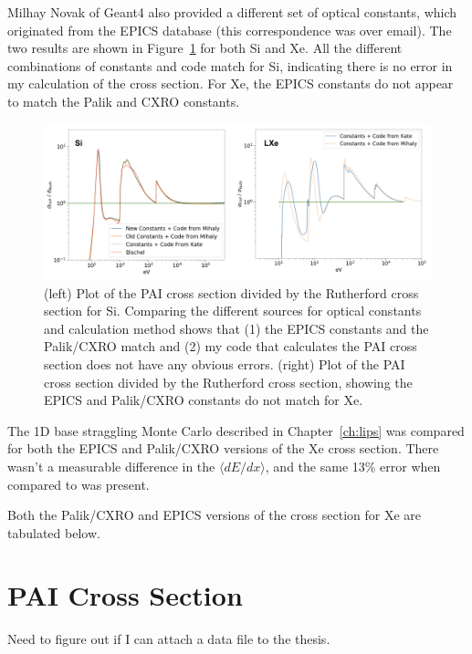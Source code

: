 Milhay Novak of Geant4 also provided a different set of optical constants, which originated from the EPICS database (this correspondence was over email). The two results are shown in Figure~\ref{fig:pai_different_consts} for both Si and Xe. All the different combinations of constants and code match for Si, indicating there is no error in my calculation of the cross section. For Xe, the EPICS constants do not appear to match the Palik and CXRO constants.

\begin{figure}[htbp]
\begin{center}
\includegraphics[width=\textwidth]{figures/app/pai_different_consts.png}
\caption{ (left) Plot of the \acs{PAI} cross section divided by the Rutherford cross section for Si. Comparing the different sources for optical constants and calculation method shows that (1) the EPICS constants and the Palik/CXRO match and (2) my code that calculates the \acs{PAI} cross section does not have any obvious errors. (right) Plot of the \acs{PAI} cross section divided by the Rutherford cross section, showing the EPICS and Palik/CXRO constants do not match for Xe.}
\label{fig:pai_different_consts}
\end{center}
\end{figure}

The 1D base straggling Monte Carlo described in Chapter~\ref{ch:lips} was compared for both the EPICS and Palik/CXRO versions of the Xe cross section. There wasn't a measurable difference in the $\langle dE/dx \rangle$, and the same 13\% error when compared to \cite{PDG} was present.

Both the Palik/CXRO and EPICS versions of the cross section for Xe are tabulated below.

\section{PAI Cross Section}
Need to figure out if I can attach a data file to the thesis. 

